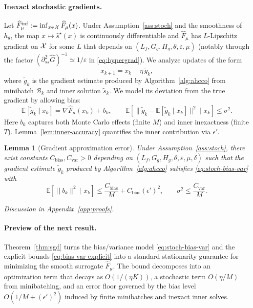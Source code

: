 \documentclass{uai2026} %
\theoremstyle{plain}
\newtheorem{lemma}{Lemma}
\theoremstyle{definition}
\begin{document}
\paragraph{Inexact stochastic gradients.}
Let $\widehat F_\mu^{\inf}:=\inf_{x\in\mathcal{X}}\widehat F_\mu(x)$.
Under Assumption~\ref{ass:stoch} and the smoothness of $h_\theta$, the map $x\mapsto \widehat s^\star(x)$ is continuously differentiable and $\widehat F_\mu$ has $L$-Lipschitz gradient on $\mathcal{X}$ for some $L$ that depends on $(L_f,G_g,H_g,\theta,\varepsilon,\mu)$ (notably through the factor $(\partial^2_{ss}\widehat G)^{-1}\simeq 1/\varepsilon$ in \eqref{eq:hypergrad}).
We analyze updates of the form
\[
  x_{k+1}=x_k-\eta\,\tilde g_k,
\]
where $\tilde g_k$ is the gradient estimate produced by Algorithm~\ref{alg:ahcco} from minibatch $\mathcal{B}_k$ and inner solution $\tilde s_k$.
We model its deviation from the true gradient by allowing bias:
\begin{equation}
  \mathbb{E}[\tilde g_k\mid x_k]=\nabla \widehat F_\mu(x_k)+b_k,
  \qquad
  \mathbb{E}\!\left[\|\tilde g_k-\mathbb{E}[\tilde g_k\mid x_k]\|^2\mid x_k\right]\le \sigma^2.\label{eq:stoch-bias-var}
\end{equation}
Here $b_k$ captures both Monte Carlo effects (finite $M$) and inner inexactness (finite $T$).
Lemma~\ref{lem:inner-accuracy} quantifies the inner contribution via $\epsilon'$.

\begin{lemma}[Gradient approximation error]\label{lem:grad-approx}
Under Assumption~\ref{ass:stoch}, there exist constants $C_{\mathrm{bias}},C_{\mathrm{var}}>0$ depending on $(L_f,G_g,H_g,\theta,\varepsilon,\mu,\delta)$ such that the gradient estimate $\tilde g_k$ produced by Algorithm~\ref{alg:ahcco} satisfies \eqref{eq:stoch-bias-var} with
\begin{equation}
  \mathbb{E}\!\left[\|b_k\|^2\mid x_k\right]\le \frac{C_{\mathrm{bias}}}{M}+C_{\mathrm{bias}}(\epsilon')^2,
  \qquad
  \sigma^2\le \frac{C_{\mathrm{var}}}{M}.\label{eq:bias-var-explicit}
\end{equation}
\end{lemma}
\emph{Discussion in Appendix~\ref{app:proofs}.}

\paragraph{Preview of the next result.}
Theorem~\ref{thm:sgd} turns the bias/variance model \eqref{eq:stoch-bias-var} and the explicit bounds \eqref{eq:bias-var-explicit} into a standard stationarity guarantee for minimizing the smooth surrogate $\widehat F_\mu$.
The bound decomposes into an optimization term that decays as $O(1/(\eta K))$, a stochastic term $O(\eta/M)$ from minibatching, and an error floor governed by the bias level $O(1/M+(\epsilon')^2)$ induced by finite minibatches and inexact inner solves.
\end{document}
